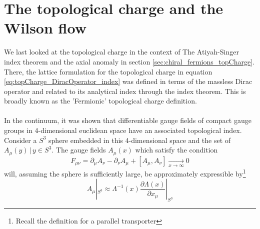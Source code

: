 \documentclass[a4paper,10pt]{book}
\begin{document}
\section{The topological charge and the Wilson flow}
We last looked at the topological charge in the context of The Atiyah-Singer index theorem and the axial anomaly in section \ref{sec:chiral_fermions_topCharge}. There, the lattice formulation for the topological charge in equation \eqref{eq:topCharge_DiracOperator_index} was defined in terms of the massless Dirac operator and related to its analytical index through the index theorem. This is broadly known as the 'Fermionic' topological charge definition.\\\\In the continuum, it was shown \cite{BelavinA.A1975Psot} that differentiable gauge fields of compact gauge groups in 4-dimensional euclidean space have an associated topological index. Consider a $S^3$ sphere embedded in this 4-dimensional space and the set of $A_\mu(y)\,|\,y\in S^3$. The gauge fields $A_\mu(x)$ which satisfy the condition 
\begin{equation}
F_{\mu \nu}=\partial_{\mu} A_{\nu}-\partial_{\nu} A_{\mu}+\left[A_{\mu}, A_{\nu}\right] \underset{x \rightarrow \infty}{\rightarrow} 0
\end{equation}
will, assuming the sphere is sufficiently large, be approximately expressible by\footnote{Recall the definition for a parallel transporter}
\begin{equation}
A_{\mu}\left|_{S^{3}} \approx \Lambda^{-1}(x) \frac{\partial \Lambda(x)}{\partial x_{\mu}}\right|_{S^{3}}
\end{equation}
\end{document}
